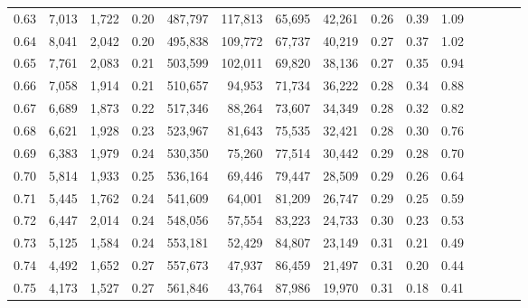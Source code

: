 \begin{tabular}{rrrcrrrrrrrrrrr}
0.63 &   7,013 &  1,722 &                                       0.20 &  487,797 &  117,813 &   65,695 &   42,261 &  0.26 &  0.39 &                         1.09 \\
0.64 &   8,041 &  2,042 &                                       0.20 &  495,838 &  109,772 &   67,737 &   40,219 &  0.27 &  0.37 &                         1.02 \\
0.65 &   7,761 &  2,083 &                                       0.21 &  503,599 &  102,011 &   69,820 &   38,136 &  0.27 &  0.35 &                         0.94 \\
0.66 &   7,058 &  1,914 &                                       0.21 &  510,657 &   94,953 &   71,734 &   36,222 &  0.28 &  0.34 &                         0.88 \\
0.67 &   6,689 &  1,873 &                                       0.22 &  517,346 &   88,264 &   73,607 &   34,349 &  0.28 &  0.32 &                         0.82 \\
0.68 &   6,621 &  1,928 &                                       0.23 &  523,967 &   81,643 &   75,535 &   32,421 &  0.28 &  0.30 &                         0.76 \\
0.69 &   6,383 &  1,979 &                                       0.24 &  530,350 &   75,260 &   77,514 &   30,442 &  0.29 &  0.28 &                         0.70 \\
0.70 &   5,814 &  1,933 &                                       0.25 &  536,164 &   69,446 &   79,447 &   28,509 &  0.29 &  0.26 &                         0.64 \\
0.71 &   5,445 &  1,762 &                                       0.24 &  541,609 &   64,001 &   81,209 &   26,747 &  0.29 &  0.25 &                         0.59 \\
0.72 &   6,447 &  2,014 &                                       0.24 &  548,056 &   57,554 &   83,223 &   24,733 &  0.30 &  0.23 &                         0.53 \\
0.73 &   5,125 &  1,584 &                                       0.24 &  553,181 &   52,429 &   84,807 &   23,149 &  0.31 &  0.21 &                         0.49 \\
0.74 &   4,492 &  1,652 &                                       0.27 &  557,673 &   47,937 &   86,459 &   21,497 &  0.31 &  0.20 &                         0.44 \\
0.75 &   4,173 &  1,527 &                                       0.27 &  561,846 &   43,764 &   87,986 &   19,970 &  0.31 &  0.18 &                         0.41 \\

\end{tabular}
